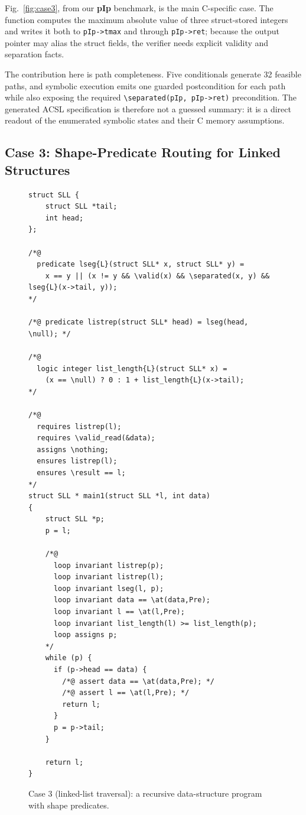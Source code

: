 Fig.~\ref{fig:case3}, from our \textbf{pIp} benchmark, is the main C-specific case. The function computes the maximum absolute value of three struct-stored integers and writes it both to \texttt{pIp->tmax} and through \texttt{pIp->ret}; because the output pointer may alias the struct fields, the verifier needs explicit validity and separation facts.

The contribution here is path completeness. Five conditionals generate 32 feasible paths, and symbolic execution emits one guarded postcondition for each path while also exposing the required \texttt{\textbackslash separated(pIp, pIp->ret)} precondition. The generated ACSL specification is therefore not a guessed summary: it is a direct readout of the enumerated symbolic states and their C memory assumptions.
\subsection{Case 3: Shape-Predicate Routing for Linked Structures}

\begin{figure}[!t]
    \centering
    \begin{tcolorbox}[casebox, title={Case 3: route-selected shape predicates}]
\begin{lstlisting}[style=caseinnerstyle]
struct SLL {
    struct SLL *tail;
    int head;
};

/*@
  predicate lseg{L}(struct SLL* x, struct SLL* y) =
    x == y || (x != y && \valid(x) && \separated(x, y) && lseg{L}(x->tail, y));
*/

/*@ predicate listrep(struct SLL* head) = lseg(head, \null); */

/*@
  logic integer list_length{L}(struct SLL* x) =
    (x == \null) ? 0 : 1 + list_length{L}(x->tail);
*/

/*@
  requires listrep(l);
  requires \valid_read(&data);
  assigns \nothing;
  ensures listrep(l);
  ensures \result == l;
*/
struct SLL * main1(struct SLL *l, int data)
{
    struct SLL *p;
    p = l;

    /*@
      loop invariant listrep(p);
      loop invariant listrep(l);
      loop invariant lseg(l, p);
      loop invariant data == \at(data,Pre);
      loop invariant l == \at(l,Pre);
      loop invariant list_length(l) >= list_length(p);
      loop assigns p;
    */
    while (p) {
      if (p->head == data) {
        /*@ assert data == \at(data,Pre); */
        /*@ assert l == \at(l,Pre); */
        return l;
      }
      p = p->tail;
    }

    return l;
}
\end{lstlisting}
    \end{tcolorbox}
    \caption{Case 3 (linked-list traversal): a recursive data-structure program with shape predicates.}
    \label{fig:case4}
\end{figure}

